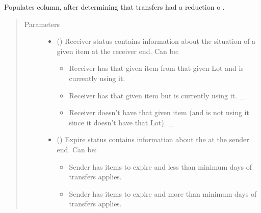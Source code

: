 \documentclass[letterpaper,10pt,english]{sphinxmanual}
\begin{document}
\begin{fulllineitems}
\label{\detokenize{source/optimization.datatools:optimization.datatools.extra_output.expire_rows}}
Populates  column, after determining that transfers had a reduction o .
\begin{quote}\begin{description}
\item[{Parameters}] \leavevmode\begin{itemize}
\item {} 
 () \textendash{} 
Receiver status contains information about the situation of a given item at the receiver end. Can be:
\begin{itemize}
\item {} 
 \sphinxhyphen{} Receiver has that given item from that given Lot and is currently using it.

\item {} 
 \sphinxhyphen{} Receiver has that given item  but is  currently using it. \_

\item {} 
 \sphinxhyphen{}  Receiver doesn’t have that given item  (and is not using it since it doesn’t have that Lot). \_

\end{itemize}


\item {} 
 () \textendash{} 
Expire status contains information about the  at the sender end.         Can be:
\begin{itemize}
\item {} 
 \sphinxhyphen{} Sender has items to expire and less than minimum days of transfers applies.

\item {} 
 \sphinxhyphen{} Sender has items to expire and more than minimum days of transfers applies.


\end{itemize}
\end{itemize}
\end{description}
\end{quote}
\end{fulllineitems}
\end{document}
